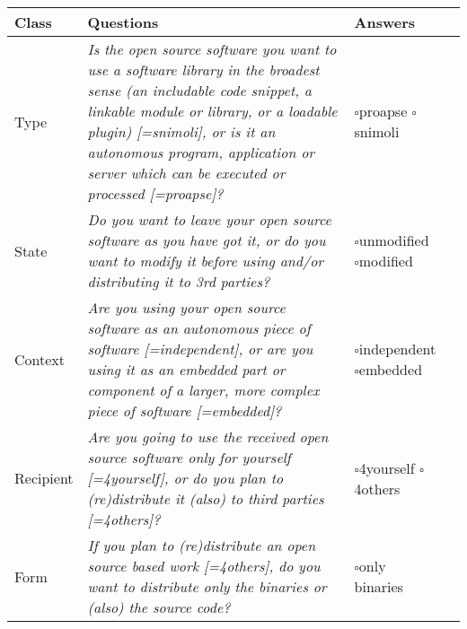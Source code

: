 \begin{small}
\begin{tabular}[h]{|l|l|l|l|}
\hline 
Class & Questions & Answers\\
\hline 
  Type
  & \parbox[c][2.6cm][c]{9.4cm}{
    \textit{Is the open source software you want to use a software library
    in the broadest sense (an includable code snippet, a linkable module or
    library, or a loadable plugin) [=snimoli], or is it an autonomous
    program, application or server which can be executed or processed
    [=proapse]?}} & \parbox{10em}{ 
      $\square$\hspace{1em}proapse\\ 
      $\square$\hspace{1em}snimoli}
    \\
\hline 
  State & 
  \parbox[c][1.6cm][c]{9.4cm}{
  \textit{Do you want to leave your open source software as you have
  got it, or do you want to modify it before using and/or distributing it to 3rd
  parties?}} &
  \parbox{10em}{
    $\square$\hspace{1em}unmodified\\
    $\square$\hspace{1em}modified} \\
\hline 
  Context & 
  \parbox[c][2cm][c]{9.4cm}{
  \textit{Are you using your open source software as an au\-to\-no\-mous piece
  of software [=independent], or are you using it as an embedded part or component
  of a larger, more complex piece of software [=embedded]?}} &
  \parbox{10em}{ $\square$\hspace{1em}independent\\
    $\square$\hspace{1em}embedded}\\
\hline 
  Recipient & 
  \parbox[c][1.6cm][c]{9.4cm}{
  \textit{Are you going to use the received open source software only for
  yourself [=4yourself], or do you plan to (re)distribute it (also) to third
  parties [=4others]?}}
  & \parbox{10em}{
    $\square$\hspace{1em}4yourself\\
    $\square$\hspace{1em}4others}\\
\hline 
  Form & 
  \parbox[c][1.6cm][c]{9.4cm}{
  \textit{If you plan to (re)distribute an open source based work [=4others], do
  you want to distribute only the binaries or (also) the source code?}}
  & \parbox{10em}{
    $\square$\hspace{1em}only binaries\\
}
\end{tabular}
\end{small}
